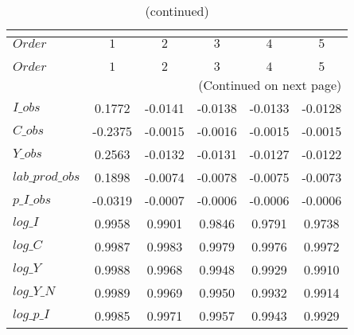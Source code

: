  
\begin{center}
\begin{longtable}{lccccc} 
\caption{COEFFICIENTS OF AUTOCORRELATION}\\
 \label{Table:th_autocorr_matrix}\\
\toprule 
$Order           $	 & 	 $          1$	 & 	 $          2$	 & 	 $          3$	 & 	 $          4$	 & 	 $          5$\\
\midrule \endfirsthead 
\caption{(continued)}\\
 \toprule \\ 
$Order           $	 & 	 $          1$	 & 	 $          2$	 & 	 $          3$	 & 	 $          4$	 & 	 $          5$\\
\midrule \endhead 
\midrule \multicolumn{6}{r}{(Continued on next page)} \\ \bottomrule \endfoot 
\bottomrule \endlastfoot 
$I\_obs          $	 & 	     0.1772	 & 	    -0.0141	 & 	    -0.0138	 & 	    -0.0133	 & 	    -0.0128 \\ 
$C\_obs          $	 & 	    -0.2375	 & 	    -0.0015	 & 	    -0.0016	 & 	    -0.0015	 & 	    -0.0015 \\ 
$Y\_obs          $	 & 	     0.2563	 & 	    -0.0132	 & 	    -0.0131	 & 	    -0.0127	 & 	    -0.0122 \\ 
$lab\_prod\_obs  $	 & 	     0.1898	 & 	    -0.0074	 & 	    -0.0078	 & 	    -0.0075	 & 	    -0.0073 \\ 
$p\_I\_obs       $	 & 	    -0.0319	 & 	    -0.0007	 & 	    -0.0006	 & 	    -0.0006	 & 	    -0.0006 \\ 
$log\_I          $	 & 	     0.9958	 & 	     0.9901	 & 	     0.9846	 & 	     0.9791	 & 	     0.9738 \\ 
$log\_C          $	 & 	     0.9987	 & 	     0.9983	 & 	     0.9979	 & 	     0.9976	 & 	     0.9972 \\ 
$log\_Y          $	 & 	     0.9988	 & 	     0.9968	 & 	     0.9948	 & 	     0.9929	 & 	     0.9910 \\ 
$log\_Y\_N       $	 & 	     0.9989	 & 	     0.9969	 & 	     0.9950	 & 	     0.9932	 & 	     0.9914 \\ 
$log\_p\_I       $	 & 	     0.9985	 & 	     0.9971	 & 	     0.9957	 & 	     0.9943	 & 	     0.9929 \\ 
\end{longtable}
 \end{center}
